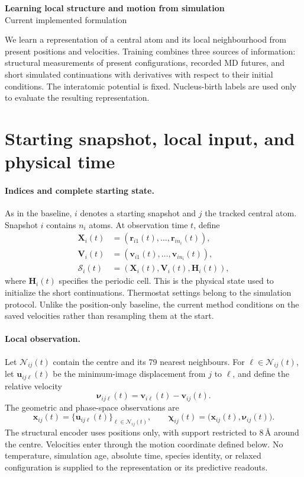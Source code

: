 \documentclass[11pt,a4paper]{article}
\newcommand{\x}{\mathbf x}
\newcommand{\X}{\mathbf X}
\begin{document}
\begin{center}
{\LARGE\bfseries Learning local structure and motion from simulation}\\[4pt]
{\small Current implemented formulation}
\end{center}
\vspace{-4pt}

We learn a representation of a central atom and its local neighbourhood from
present positions and velocities. Training combines three sources of information:
structural measurements of present configurations, recorded MD futures, and
short simulated continuations with derivatives with respect to their initial
conditions. The interatomic potential is fixed. Nucleus-birth labels are used
only to evaluate the resulting representation.

\section{Starting snapshot, local input, and physical time}

\paragraph{Indices and complete starting state.}
As in the baseline, $i$ denotes a starting snapshot and $j$ the tracked central
atom. Snapshot $i$ contains $n_i$ atoms. At observation time $t$, define
\[
\begin{aligned}
\X_i(t)&=(\mathbf r_{i1}(t),\ldots,\mathbf r_{in_i}(t)),\\
\mathbf V_i(t)&=(\mathbf v_{i1}(t),\ldots,\mathbf v_{in_i}(t)),\\
\mathcal S_i(t)&=(\X_i(t),\mathbf V_i(t),\mathbf H_i(t)),
\end{aligned}
\]
where $\mathbf H_i(t)$ specifies the periodic cell. This is the physical state
used to initialize the short continuations. Thermostat settings belong to the
simulation protocol. Unlike the position-only baseline, the current method
conditions on the saved velocities rather than resampling them at the start.

\paragraph{Local observation.}
Let $\mathcal N_{ij}(t)$ contain the centre and its 79 nearest neighbours.
For $\ell\in\mathcal N_{ij}(t)$, let $\mathbf u_{ij\ell}(t)$ be the minimum-image
displacement from $j$ to $\ell$, and define the relative velocity
\[
\boldsymbol\nu_{ij\ell}(t)=\mathbf v_{i\ell}(t)-\mathbf v_{ij}(t).
\]
The geometric and phase-space observations are
\[
\x_{ij}(t)=\{\mathbf u_{ij\ell}(t)\}_{\ell\in\mathcal N_{ij}(t)},
\qquad
\boldsymbol\chi_{ij}(t)=\bigl(\x_{ij}(t),\boldsymbol\nu_{ij}(t)\bigr).
\]
The structural encoder uses positions only, with support restricted to $8$\,\AA{}
around the centre. Velocities enter through the motion coordinate defined below.
No temperature, simulation age, absolute time, species identity, or relaxed
configuration is supplied to the representation or its predictive readouts.
\end{document}
